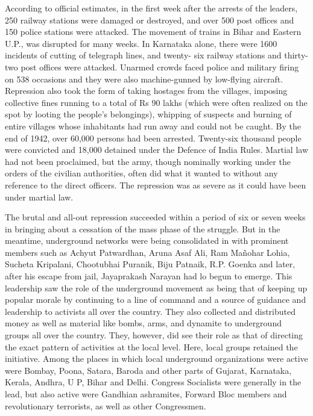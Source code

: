 According to official estimates, in the first week after the arrests of the leaders, 250 railway stations were damaged or destroyed, and over 500 post offices and 150 police stations were attacked. The movement of trains in Bihar and Eastern U.P., was disrupted for many weeks. In Karnataka alone, there were 1600 incidents of cutting of telegraph lines, and twenty- six railway stations and thirty-two post offices were attacked. Unarmed crowds faced police and military firing on 538 occasions and they were also machine-gunned by low-flying aircraft. Repression also took the form of taking hostages from the villages, imposing collective fines running to a total of Rs 90 lakhs (which were often realized on the spot by looting the people's belongings), whipping of suspects and burning of entire villages whose inhabitants had run away and could not be caught. By the end of 1942, over 60,000 persons had been arrested. Twenty-six thousand people were convicted and 18,000 detained under the Defence of India Rules. Martial law had not been proclaimed, but the army, though nominally working under the orders of the civilian authorities, often did what it wanted to without any reference to the direct officers. The repression was as severe as it could have been under martial law.

The brutal and all-out repression succeeded within a period of six or seven weeks in bringing about a cessation of the mass phase of the struggle. But in the meantime, underground networks were being consolidated in with prominent members such as Achyut Patwardhan, Aruna Asaf Ali, Ram Mañohar Lohia, Sucheta Kripalani, Chootubhai Puranik, Biju Patnaik, R.P. Goenka and later, after his escape from jail, Jayaprakash Narayan had lo begun to emerge. This leadership saw the role of the underground movement as being that of keeping up popular morale by continuing to a line of command and a source of guidance and leadership to activists all over the country. They also collected and distributed money as well as material like bombs, arms, and dynamite to underground groups all over the country. They, however, did see their role as that of directing the exact pattern of activities at the local level. Here, local groups retained the initiative. Among the places in which local underground organizations were active were Bombay, Poona, Satara, Baroda and other parts of Gujarat, Karnataka, Kerala, Andhra, U P, Bihar and Delhi. Congress Socialists were generally in the lead, but also active were Gandhian ashramites, Forward Bloc members and revolutionary terrorists, as well as other Congressmen.

